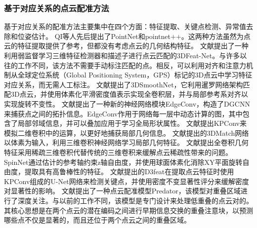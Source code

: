     \subsubsection{基于对应关系的点云配准方法}
    基于对应关系的配准方法主要集中在四个方面：特征提取、关键点检测、异常值去除和位姿估计。
    QI等人先后提出了PointNet和pointnet++。这两种方法虽然为点云的特征提取提供了参考，但都没有考虑点云的几何结构特征。
    文献\cite{3DFeat-Net}提出了一种利用弱监督学习三维特征检测器和描述子进行点云匹配的3DFeat-Net。与许多以往的工作不同，该方法不需要手动标注匹配的点。相反，可以利用对齐和注意力机制从全球定位系统（Global Positioning System，GPS）标记的3D点云中学习特征对应关系，而无需人工标注。
    文献\cite{PerfectMatch}提出了3DSmoothNet，它利用暹罗网络架构匹配3D点云，并使用体素化平滑密度值表示实现全卷积层，并与局部参考系对齐以实现旋转不变性。
    文献\cite{DGCNN}提出了一种新的神经网络模块EdgeConv，构造了DGCNN来捕获点之间的拓扑信息。EdgeConv作用于网络每一层中动态计算的图，其中包含了局部邻域信息，并可以叠加应用于学习全局形状属性。
    文献\cite{KPConv}提出KPConv来模拟二维卷积中的运算，以更好地捕获局部几何信息。
    文献\cite{3DMatch}提出的3DMatch网络以体素为输入，利用三维卷积神经网络学习局部几何特征。
    文献\cite{FCGF}提出全卷积几何特征采用稀疏三维卷积代替传统的三维卷积来缓解点云稀疏性带来的问题。
    SpinNet通过估计的参考轴约束z轴自由度，并使用球面体素化消除XY平面旋转自由度，提取具有高鲁棒性的特征。
    文献\cite{D3Feat}提出的D3feat在提取点云特征时使用KPConv组成的U-Net网络来检测关键点，并使用密度不变显著性评分来缓解密度对显著性的影响。
    文献\cite{PREDATOR}提出了一种点云配准模型Predator，该模型对重叠区域进行了深度关注。与以前的工作不同，该模型是专门设计来处理低重叠的点云对的。其核心思想是在两个点云的潜在编码之间进行早期信息交换的重叠注意块，以预测哪些点不仅是显著的，而且还位于两个点云之间的重叠区域。
    

